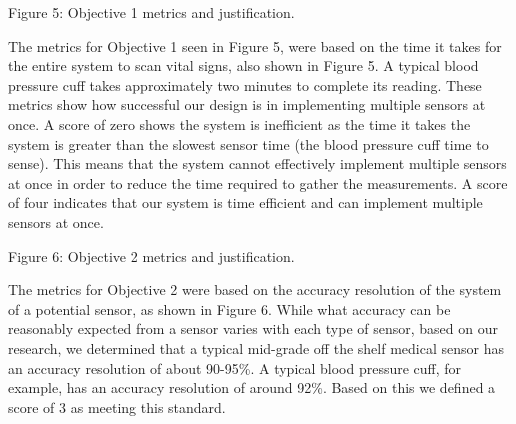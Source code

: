 ﻿\documentclass[10pt]{article}
\begin{document}
Figure 5: Objective 1 metrics and justification.


The metrics for Objective 1 seen in Figure 5, were based on the time it takes for the entire system to scan vital signs, also shown in Figure 5. A typical blood pressure cuff takes approximately two minutes to complete its reading. These metrics show how successful our design is in implementing multiple sensors at once. A score of zero shows the system is inefficient as the time it takes the system is greater than the slowest sensor time (the blood pressure cuff time to sense). This means that the system cannot effectively implement multiple sensors at once in order to reduce the time required to gather the measurements. A score of four indicates that our system is time efficient and can implement multiple sensors at once. 
%
%
%
%
	

Figure 6: Objective 2 metrics and justification.


The metrics for Objective 2 were based on the accuracy resolution of the system of a potential sensor, as shown in Figure 6. While what accuracy can be reasonably expected from a sensor varies with each type of sensor, based on our research, we determined that a typical mid-grade off the shelf medical sensor has an accuracy resolution of about 90-95\%. A typical blood pressure cuff, for example, has an accuracy resolution of around 92\%. Based on this we defined a score of 3 as meeting this standard.

%
%	
\end{document}
